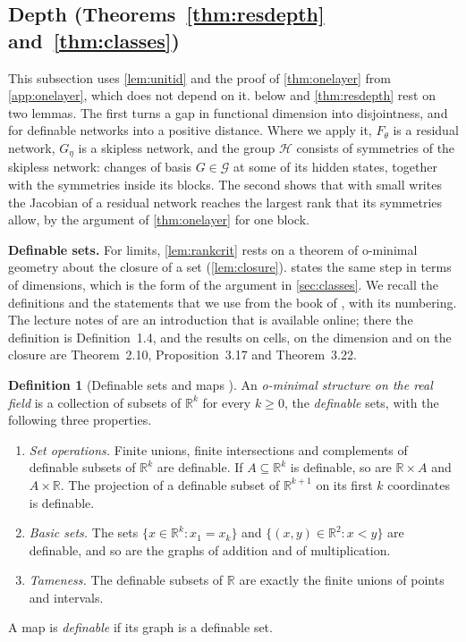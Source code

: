 \documentclass[10pt]{article}
\theoremstyle{definition}
\newtheorem{definition}[theorem]{Definition}
\theoremstyle{remark}
\newcommand{\R}{\mathbb{R}}
\newcommand{\G}{\mathcal{G}}
\newcommand{\para}[1]{\smallskip\noindent\textbf{#1}\hspace{0.5em}}
\begin{document}
\subsection{Depth\texorpdfstring{ (Theorems~\ref*{thm:resdepth} and~\ref*{thm:classes})}{}}\label{app:depth}

This subsection uses \cref{lem:unitid} and the proof of \cref{thm:onelayer} from \cref{app:onelayer}, which does not depend on it.  below and \cref{thm:resdepth} rest on two lemmas. The first turns a gap in functional dimension into disjointness, and for definable networks into a positive distance. Where we apply it, $F_\theta$ is a residual network, $G_\eta$ is a skipless network, and the group $\mathcal H$ consists of symmetries of the skipless network: changes of basis $G \in \G$ at some of its hidden states, together with the symmetries inside its blocks. The second shows that with small writes the Jacobian of a residual network reaches the largest rank that its symmetries allow, by the argument of \cref{thm:onelayer} for one block.

\para{Definable sets.} For limits, \cref{lem:rankcrit} rests on a theorem of o-minimal geometry about the closure of a set (\cref{lem:closure}).  states the same step in terms of dimensions, which is the form of the argument in \cref{sec:classes}. We recall the definitions and the statements that we use from the book of \citet{vandendries1998tame}, with its numbering. The lecture notes of \citet{coste1999ominimal} are an introduction that is available online; there the definition is Definition~1.4, and the results on cells, on the dimension and on the closure are Theorem~2.10, Proposition~3.17 and Theorem~3.22.

\begin{definition}[Definable sets and maps {\citep[Chapter~1, (2.1) and (3.2)]{vandendries1998tame}}]\label{def:definable}
An \emph{o-minimal structure on the real field} is a collection of subsets of $\R^k$ for every $k \ge 0$, the \emph{definable} sets, with the following three properties.
\begin{enumerate}[label=\textup{(\roman*)},nosep]
\item \emph{Set operations.} Finite unions, finite intersections and complements of definable subsets of $\R^k$ are definable. If $A \subseteq \R^k$ is definable, so are $\R \times A$ and $A \times \R$. The projection of a definable subset of $\R^{k+1}$ on its first $k$ coordinates is definable.
\item \emph{Basic sets.} The sets $\{x \in \R^k : x_1 = x_k\}$ and $\{(x, y) \in \R^2 : x < y\}$ are definable, and so are the graphs of addition and of multiplication.
\item \emph{Tameness.} The definable subsets of $\R$ are exactly the finite unions of points and intervals.
\end{enumerate}
A map is \emph{definable} if its graph is a definable set.
\end{definition}
\end{document}

